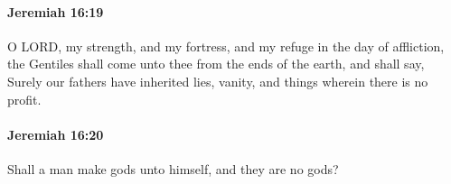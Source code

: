 		\paragraph{Jeremiah 16:19} %
			\label{JEREMIAH-16-19}

			O LORD, my strength, and my fortress, and my refuge in the day of affliction, the Gentiles shall come unto thee from the ends of the earth, and shall say, Surely our fathers have inherited lies, vanity, and things wherein there is no profit.


		\paragraph{Jeremiah 16:20} %
			\label{JEREMIAH-16-20}

			Shall a man make gods unto himself, and they are no gods?



